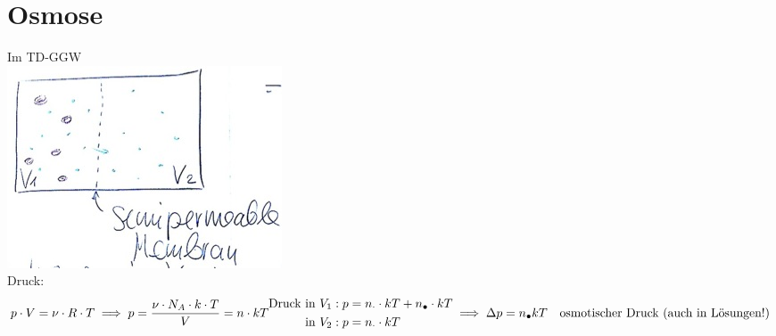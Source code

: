 \section{Osmose}
Im TD-GGW \\
\includegraphics{Bild128} \\
Druck:
\[
	p \cdot V = \nu \cdot R \cdot T \\
	\implies p = \frac{\nu \cdot N_A \cdot k \cdot T}{V} = n \cdot kT \\
	\begin{split}
		\text{Druck }
			&\text{in } V_1 : p = n_\cdot \cdot kT + n_\bullet \cdot kT \\
			&\text{in } V_2 : p = n_\cdot \cdot kT
	\end{split} \\
	\implies \Delta p = n_\bullet kT \quad \text{osmotischer Druck (auch in Lösungen!)}
\]


